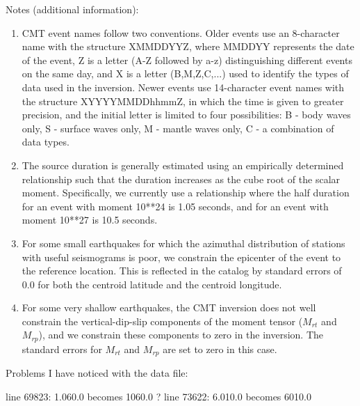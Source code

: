         
Notes (additional information):
\begin{enumerate}
\item CMT event names follow two conventions. Older events use an 8-character 
name with the structure XMMDDYYZ, where MMDDYY represents the date of
the event, Z is a letter (A-Z followed by a-z) distinguishing different 
events on the same day, and X is a letter (B,M,Z,C,...) used to identify 
the types of data used in the inversion. Newer events use 14-character event 
names with the structure XYYYYMMDDhhmmZ, in which the time is given to greater
precision, and the initial letter is limited to four possibilities: B - body 
waves only, S - surface waves only, M - mantle waves only, C - a combination 
of data types.

\item The source duration is generally estimated using an empirically determined
relationship such that the duration increases as the cube root of the scalar
moment. Specifically, we currently use a relationship where the half duration
for an event with moment 10**24 is 1.05 seconds, and for an event with moment
10**27 is 10.5 seconds.

\item For some small earthquakes for which the azimuthal distribution of stations 
with useful seismograms is poor, we constrain the epicenter of the event to
the reference location. This is reflected in the catalog by standard 
errors of 0.0 for both the centroid latitude and the centroid longitude.

\item For some very shallow earthquakes, the CMT inversion does not well 
constrain the vertical-dip-slip components of the moment tensor ($M_{rt}$ and $M_{rp}$),
and we constrain these components to zero in the inversion. The standard
errors for $M_{rt}$ and $M_{rp}$ are set to zero in this case.
\end{enumerate}


Problems I have noticed with the data file:

line 69823: 1.060.0 becomes 1060.0 ?
line 73622: 6.010.0 becomes 6010.0 

 
